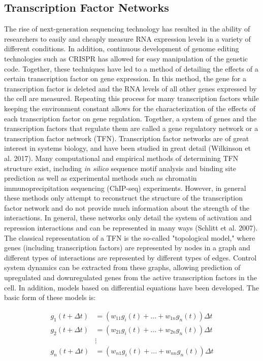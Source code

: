 \documentclass[paper=a4, fontsize=11pt]{scrartcl} %
\begin{document}
\subsection{Transcription Factor Networks}
The rise of next-generation sequencing technology has resulted in the ability of researchers to easily and cheaply measure RNA expression levels in a variety of different conditions. In addition, continuous development of genome editing technologies such as CRISPR has allowed for easy manipulation of the genetic code. Together, these techniques have led to a method of detailing the effects of a certain transcription factor on gene expression. In this method, the gene for a transcription factor is deleted and the RNA levels of all other genes expressed by the cell are measured. Repeating this process for many transcription factors while keeping the environment constant allows for the characterization of the effects of each transcription factor on gene regulation. Together, a system of genes and the transcription factors that regulate them are called a  gene regulatory network or a transcription factor network (TFN). Transcription factor networks are of great interest in systems biology, and have been studied in great detail (Wilkinson et al. 2017). Many computational and empirical methods of determining TFN structure exist, including \textit{in silico} sequence motif analysis and binding site prediction as well as experimental methods such as chromatin immunoprecipitation sequencing (ChIP-seq) experiments. However, in general these methods only attempt to reconstruct the structure of the transcription factor network and do not provide much information about the strength of the interactions. In general, these networks only detail the system of activation and repression interactions and can be represented in many ways (Schlitt et al. 2007). The classical representation of a TFN is the so-called "topological model," where genes (including transcription factors) are represented by nodes in a graph and different types of interactions are represented by different types of edges. Control system dynamics can be extracted from these graphs, allowing prediction of upregulated and downregulated genes from the active transcription factors in the cell. In addition, models based on differential equations have been developed. The basic form of these models is:

\begin{align*}
   g_1(t + \Delta t) &= \left(w_{11} g_i(t) + ... + w_{1n} g_n(t)\right) \Delta t \\
   g_2(t + \Delta t) &= \left(w_{21} g_i(t) + ... + w_{2n} g_n(t)\right) \Delta t \\
   &\vdots\\
   g_n(t + \Delta t) &= \left(w_{n1} g_i(t) + ... + w_{nn} g_n(t)\right) \Delta t
\end{align*}
\end{document}
